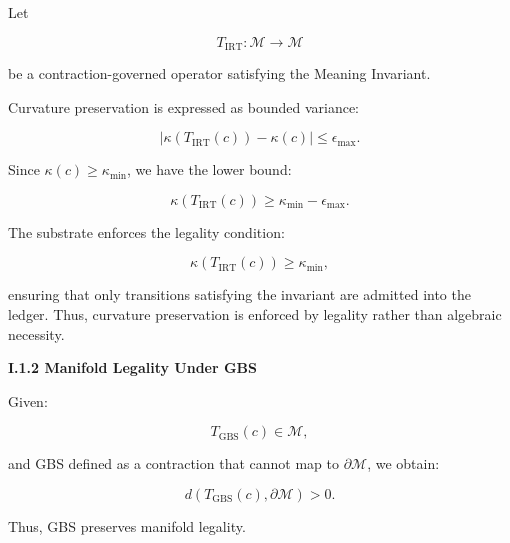 Let


\[
T_{\mathrm{IRT}} : \mathcal{M} \rightarrow \mathcal{M}
\]


be a contraction-governed operator satisfying the Meaning Invariant.

Curvature preservation is expressed as bounded variance:


\[
|\kappa(T_{\mathrm{IRT}}(c)) - \kappa(c)| \le \epsilon_{\max}.
\]



Since $\kappa(c) \ge \kappa_{\min}$, we have the lower bound:


\[
\kappa(T_{\mathrm{IRT}}(c)) \ge \kappa_{\min} - \epsilon_{\max}.
\]



The substrate enforces the legality condition:


\[
\kappa(T_{\mathrm{IRT}}(c)) \ge \kappa_{\min},
\]


ensuring that only transitions satisfying the invariant are admitted into the
ledger. Thus, curvature preservation is enforced by legality rather than
algebraic necessity.

\textbf{I.1.2 Manifold Legality Under GBS}

Given:


\[
T_{\mathrm{GBS}}(c) \in \mathcal{M},
\]


and GBS defined as a contraction that cannot map to $\partial \mathcal{M}$, we
obtain:


\[
d(T_{\mathrm{GBS}}(c), \partial \mathcal{M}) > 0.
\]



Thus, GBS preserves manifold legality.

